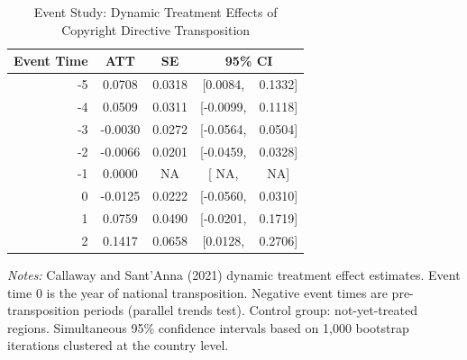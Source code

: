 \begin{table}[htbp]
\centering
\caption{Event Study: Dynamic Treatment Effects of Copyright Directive Transposition}
\label{tab:eventstudy}
\begin{tabular}{rcccc}
\toprule
Event Time & ATT & SE & \multicolumn{2}{c}{95\% CI} \\
\midrule
-5 & 0.0708 & 0.0318 & [0.0084, & 0.1332] \\
-4 & 0.0509 & 0.0311 & [-0.0099, & 0.1118] \\
-3 & -0.0030 & 0.0272 & [-0.0564, & 0.0504] \\
-2 & -0.0066 & 0.0201 & [-0.0459, & 0.0328] \\
-1 & 0.0000 &    NA & [   NA, &    NA] \\
\midrule
0 & -0.0125 & 0.0222 & [-0.0560, & 0.0310] \\
1 & 0.0759 & 0.0490 & [-0.0201, & 0.1719] \\
2 & 0.1417 & 0.0658 & [0.0128, & 0.2706] \\
\bottomrule
\end{tabular}
\begin{tablenotes}
\small
\item \textit{Notes:} Callaway and Sant'Anna (2021) dynamic treatment effect estimates. Event time 0 is the year of national transposition. Negative event times are pre-transposition periods (parallel trends test). Control group: not-yet-treated regions. Simultaneous 95\% confidence intervals based on 1,000 bootstrap iterations clustered at the country level.
\end{tablenotes}
\end{table}
